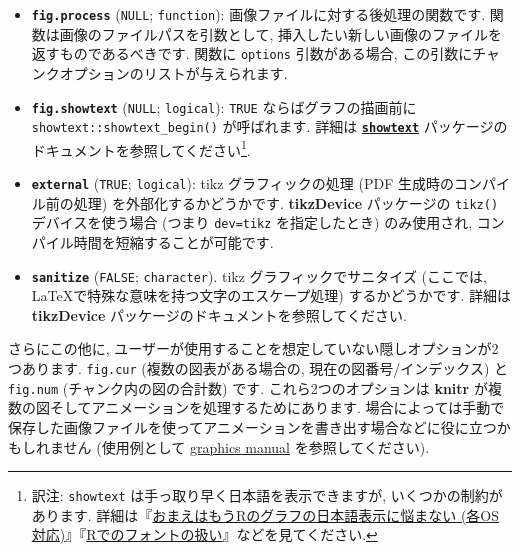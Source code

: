 \documentclass[
  lualatex,ja=standard,jafont=noto-otf]{bxjsreport}
\begin{document}
\begin{itemize}
  \texttt{fig.sep\ =\ c(\textquotesingle{}\textquotesingle{},\ \textquotesingle{}\textquotesingle{},\ \textquotesingle{}\textbackslash{}\textbackslash{}newline\textquotesingle{},\ \textquotesingle{}\textquotesingle{},\ \textquotesingle{}\textquotesingle{},\ \textquotesingle{}\textbackslash{}\textbackslash{}newline\textquotesingle{},\ \textquotesingle{}\textquotesingle{},\ ...)}
  となります. \texttt{fig.sep}
  の長さがサブ画像の数より大きい場合を除いて,
  \emph{i}番目のセパレータは\emph{i}番目のサブ画像の後に追加されます.
  この例外の場合は, \texttt{fig.sep}
  の1番目の要素が最初のサブ画像の前に追加され,
  (\emph{i+1})番目の要素が\emph{i}番目の画像の後に追加されます.
\item
  \textbf{\texttt{fig.process}} (\texttt{NULL}; \texttt{function}):
  画像ファイルに対する後処理の関数です.
  関数は画像のファイルパスを引数として,
  挿入したい新しい画像のファイルを返すものであるべきです. 関数に
  \texttt{options} 引数がある場合,
  この引数にチャンクオプションのリストが与えられます.
\item
  \textbf{\texttt{fig.showtext}} (\texttt{NULL}; \texttt{logical}):
  \texttt{TRUE} ならばグラフの描画前に
  \texttt{showtext::showtext\_begin()} が呼ばれます. 詳細は
  \href{http://cran.rstudio.com/package=showtext}{\textbf{\texttt{showtext}}}
  パッケージのドキュメントを参照してください\footnote{訳注:
    \texttt{showtext} は手っ取り早く日本語を表示できますが,
    いくつかの制約があります.
    詳細は『\href{https://ill-identified.hatenablog.com/entry/2020/10/03/200618}{おまえはもうRのグラフの日本語表示に悩まない
    (各OS対応)}』『\href{https://oku.edu.mie-u.ac.jp/~okumura/stat/font.html}{Rでのフォントの扱い}』などを見てください.}.
\item
  \textbf{\texttt{external}} (\texttt{TRUE}; \texttt{logical}): tikz
  グラフィックの処理 (PDF 生成時のコンパイル前の処理)
  を外部化するかどうかです. \textbf{tikzDevice} パッケージの
  \texttt{tikz()} デバイスを使う場合 (つまり
  \texttt{dev=\textquotesingle{}tikz\textquotesingle{}} を指定したとき)
  のみ使用され, コンパイル時間を短縮することが可能です.
\item
  \textbf{\texttt{sanitize}} (\texttt{FALSE}; \texttt{character}). tikz
  グラフィックでサニタイズ (ここでは,
  LaTeXで特殊な意味を持つ文字のエスケープ処理) するかどうかです. 詳細は
  \textbf{tikzDevice} パッケージのドキュメントを参照してください.
\end{itemize}

さらにこの他に,
ユーザーが使用することを想定していない隠しオプションが2つあります.
\texttt{fig.cur} (複数の図表がある場合の, 現在の図番号/インデックス) と
\texttt{fig.num} (チャンク内の図の合計数) です. これら2つのオプションは
\textbf{knitr} が複数の図そしてアニメーションを処理するためにあります.
場合によっては手動で保存した画像ファイルを使ってアニメーションを書き出す場合などに役に立つかもしれません
(使用例として
\href{https://github.com/yihui/knitr/releases/download/doc/knitr-graphics.pdf}{graphics
manual} を参照してください).
\end{document}
